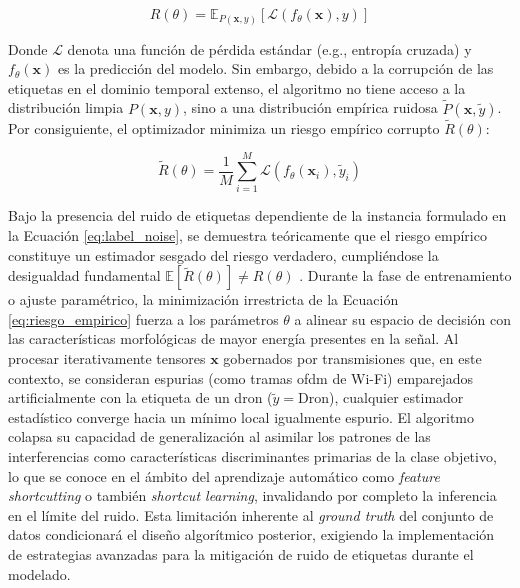 \begin{equation}
    R(\theta) = \mathbb{E}_{P(\mathbf{x}, y)} \left[ \mathcal{L}(f_\theta(\mathbf{x}), y) \right]
    \label{eq:riesgo_teorico}
\end{equation}

Donde $\mathcal{L}$ denota una función de pérdida estándar (e.g., entropía cruzada) y $f_\theta(\mathbf{x})$ es la predicción del modelo. Sin embargo, debido a la corrupción de las etiquetas en el dominio temporal extenso, el algoritmo no tiene acceso a la distribución limpia $P(\mathbf{x}, y)$, sino a una distribución empírica ruidosa $\tilde{P}(\mathbf{x}, \tilde{y})$. Por consiguiente, el optimizador minimiza un riesgo empírico corrupto $\tilde{R}(\theta)$:

\begin{equation}
    \tilde{R}(\theta) = \frac{1}{M} \sum_{i=1}^{M} \mathcal{L}(f_\theta(\mathbf{x}_i), \tilde{y}_i)
    \label{eq:riesgo_empirico}
\end{equation}

Bajo la presencia del ruido de etiquetas dependiente de la instancia formulado en la Ecuación \ref{eq:label_noise}, se demuestra teóricamente que el riesgo empírico constituye un estimador sesgado del riesgo verdadero, cumpliéndose la desigualdad fundamental $\mathbb{E}[\tilde{R}(\theta)] \neq R(\theta)$ \cite{natarajan_learning_2013, song_learning_2022}. Durante la fase de entrenamiento o ajuste paramétrico, la minimización irrestricta de la Ecuación \ref{eq:riesgo_empirico} fuerza a los parámetros $\theta$ a alinear su espacio de decisión con las características morfológicas de mayor energía presentes en la señal. Al procesar iterativamente tensores $\mathbf{x}$ gobernados por transmisiones que, en este contexto, se consideran espurias (como tramas \gls{ofdm} de Wi-Fi) emparejados artificialmente con la etiqueta de un dron ($\tilde{y} = \text{Dron}$), cualquier estimador estadístico converge hacia un mínimo local igualmente espurio. El algoritmo colapsa su capacidad de generalización al asimilar los patrones de las interferencias como características discriminantes primarias de la clase objetivo, lo que se conoce en el ámbito del aprendizaje automático como \textit{feature shortcutting} o también \textit{shortcut learning}, invalidando por completo la inferencia en el límite del ruido. Esta limitación inherente al \textit{ground truth} del conjunto de datos condicionará el diseño algorítmico posterior, exigiendo la implementación de estrategias avanzadas para la mitigación de ruido de etiquetas durante el modelado.

